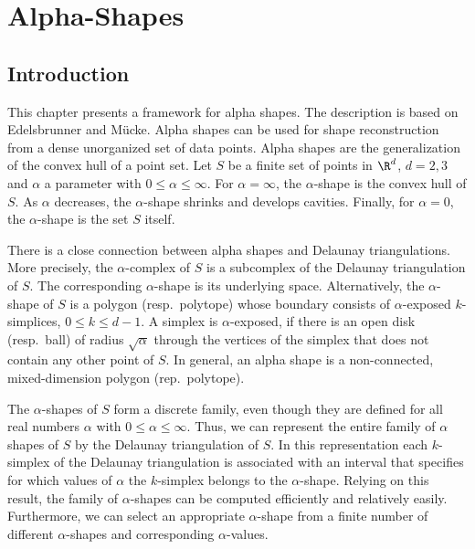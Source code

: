 
\chapter{Alpha-Shapes} \label{I1_ChapterAlphashapes}

\ccChapterSubTitle{\alphashapeRevision, \alphashapeDate}

\section{Introduction}

This chapter presents a framework for alpha shapes. The description is
based on Edelsbrunner and M\"ucke.  Alpha shapes can be used for shape
reconstruction from a dense unorganized set of data points.  Alpha
shapes are the generalization of the convex hull of a point set. Let
$S$ be a finite set of points in $\R^d$, $d = 2,3$ and $\alpha$ a
parameter with $0 \leq \alpha \leq \infty$. For $\alpha =
\infty$, the $\alpha$-shape is the convex hull of $S$.  As $\alpha$
decreases, the $\alpha$-shape shrinks and develops cavities. Finally,
for $\alpha = 0$, the $\alpha$-shape is the set $S$ itself.

There is a close connection between alpha shapes and Delaunay
triangulations. More precisely, the $\alpha$-complex of $S$ is a
subcomplex of the Delaunay triangulation of $S$.  The corresponding
$\alpha$-shape is its underlying space.  Alternatively, the
$\alpha$-shape of $S$ is a polygon (resp.\ polytope) whose boundary
consists of $\alpha$-exposed $k$-simplices, $0 \leq k \leq d-1$. A
simplex is $\alpha$-exposed, if there is an open disk (resp.\ ball) of
radius $\sqrt{\alpha}$ through the vertices of the simplex that does
not contain any other point of $S$. In general, an alpha shape is a
non-connected, mixed-dimension polygon (rep.\ polytope).

The $\alpha$-shapes of $S$ form a discrete family, even though they
are defined for all real numbers $\alpha$ with $0 \leq \alpha
\leq \infty$. Thus, we can represent the entire family of $\alpha$ shapes
of $S$ by the Delaunay triangulation of $S$. In this representation
each $k$-simplex of the Delaunay triangulation is associated with an
interval that specifies for which values of $\alpha$ the $k$-simplex
belongs to the $\alpha$-shape. Relying on this result, the family of
$\alpha$-shapes can be computed efficiently and relatively
easily. Furthermore, we can select an appropriate $\alpha$-shape from a
finite number of different $\alpha$-shapes and corresponding
$\alpha$-values.

